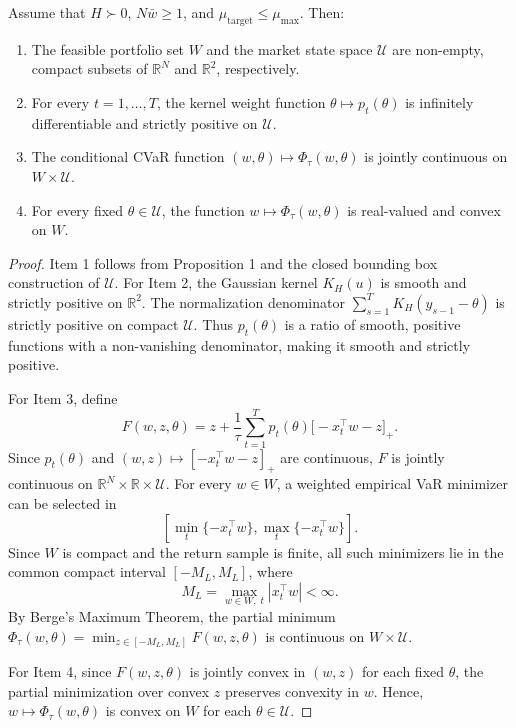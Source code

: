 \documentclass[smallcondensed]{svjour3}
\begin{document}
\begin{proposition}
Assume that $H \succ 0$, $N\bar{w} \ge 1$, and $\mu_{\text{target}} \le \mu_{\max}$. Then:
\begin{enumerate}
    \item The feasible portfolio set $W$ and the market state space $\mathcal{U}$ are non-empty, compact subsets of $\mathbb{R}^N$ and $\mathbb{R}^2$, respectively.
    \item For every $t = 1, \dots, T$, the kernel weight function $\theta \mapsto p_t(\theta)$ is infinitely differentiable and strictly positive on $\mathcal{U}$.
    \item The conditional CVaR function $(w, \theta) \mapsto \Phi_\tau(w, \theta)$ is jointly continuous on $W \times \mathcal{U}$.
    \item For every fixed $\theta \in \mathcal{U}$, the function $w \mapsto \Phi_\tau(w, \theta)$ is real-valued and convex on $W$.
\end{enumerate}
\end{proposition}

\begin{proof}
Item 1 follows from Proposition 1 and the closed bounding box construction of $\mathcal{U}$. For Item 2, the Gaussian kernel $K_H(u)$ is smooth and strictly positive on $\mathbb{R}^2$. The normalization denominator $\sum_{s=1}^T K_H(y_{s-1} - \theta)$ is strictly positive on compact $\mathcal{U}$. Thus $p_t(\theta)$ is a ratio of smooth, positive functions with a non-vanishing denominator, making it smooth and strictly positive.

For Item 3, define
\begin{equation}
F(w,z,\theta) = z+\frac{1}{\tau}\sum_{t=1}^{T} p_t(\theta)\big[-x_t^\top w-z\big]_+.
\end{equation}
Since $p_t(\theta)$ and $(w,z)\mapsto[-x_t^\top w-z]_+$ are continuous, $F$ is jointly continuous on $\mathbb R^N\times\mathbb R\times\mathcal{U}$. For every $w\in W$, a weighted empirical VaR minimizer can be selected in
\begin{equation}
\left[\min_t\{-x_t^\top w\},\max_t\{-x_t^\top w\}\right].
\end{equation}
Since $W$ is compact and the return sample is finite, all such minimizers lie in the common compact interval $[-M_L,M_L]$, where
\begin{equation}
M_L=\max_{w\in W,\;t}|x_t^\top w|<\infty.
\end{equation}
By Berge's Maximum Theorem, the partial minimum $\Phi_\tau(w, \theta) = \min_{z \in [-M_L, M_L]} F(w, z, \theta)$ is continuous on $W \times \mathcal{U}$.

For Item 4, since $F(w, z, \theta)$ is jointly convex in $(w, z)$ for each fixed $\theta$, the partial minimization over convex $z$ preserves convexity in $w$. Hence, $w \mapsto \Phi_\tau(w, \theta)$ is convex on $W$ for each $\theta \in \mathcal{U}$.
\end{proof}
\end{document}
